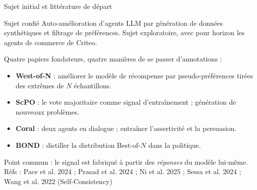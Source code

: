 \documentclass[aspectratio=169,10pt]{beamer}
\newcommand{\refs}[1]{\vfill{\tiny\textcolor{crMid}{Réfs : #1}}}
\begin{document}
\begin{frame}{Sujet initial et littérature de départ}
\begin{block}{Sujet confié}
Auto-amélioration d'agents LLM par génération de données synthétiques et filtrage de préférences. Sujet exploratoire, avec pour horizon les agents de commerce de Criteo.
\end{block}
\vspace{0.2cm}
Quatre papiers fondateurs, quatre manières de se passer d'annotations :
\begin{itemize}
  \item \textbf{West-of-N} : améliorer le modèle de récompense par pseudo-préférences tirées des extrêmes de $N$ échantillons.
  \item \textbf{ScPO} : le vote majoritaire comme signal d'entraînement ; génération de nouveaux problèmes.
  \item \textbf{Coral} : deux agents en dialogue ; entraîner l'assertivité et la persuasion.
  \item \textbf{BOND} : distiller la distribution Best-of-$N$ dans la politique.
\end{itemize}
\vspace{0.2cm}
Point commun : le signal est fabriqué à partir des \emph{réponses} du modèle lui-même.
\refs{Pace et al. 2024 ; Prasad et al. 2024 ; Ni et al. 2025 ; Sessa et al. 2024 ; Wang et al. 2022 (Self-Consistency)}
\end{frame}
\end{document}
